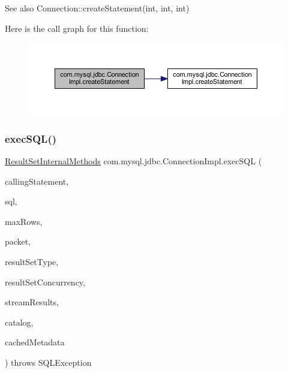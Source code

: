 \begin{DoxySeeAlso}{See also}
Connection\+::create\+Statement(int, int, int) 
\end{DoxySeeAlso}
Here is the call graph for this function\+:\nopagebreak
\begin{figure}[H]
\begin{center}
\leavevmode
\includegraphics[width=350pt]{classcom_1_1mysql_1_1jdbc_1_1_connection_impl_abcace91f81040aecda4bb5b0528a4228_cgraph}
\end{center}
\end{figure}
\mbox{\label{classcom_1_1mysql_1_1jdbc_1_1_connection_impl_ad757f25d671446b4bf4eec638de7ddce}} 
\subsubsection{\texorpdfstring{exec\+S\+Q\+L()}{execSQL()}}
{\footnotesize\ttfamily \mbox{\hyperlink{interfacecom_1_1mysql_1_1jdbc_1_1_result_set_internal_methods}{Result\+Set\+Internal\+Methods}} com.\+mysql.\+jdbc.\+Connection\+Impl.\+exec\+S\+QL (\begin{DoxyParamCaption}\item[{\mbox{\hyperlink{classcom_1_1mysql_1_1jdbc_1_1_statement_impl}{Statement\+Impl}}}]{calling\+Statement,  }\item[{String}]{sql,  }\item[{int}]{max\+Rows,  }\item[{\mbox{\hyperlink{classcom_1_1mysql_1_1jdbc_1_1_buffer}{Buffer}}}]{packet,  }\item[{int}]{result\+Set\+Type,  }\item[{int}]{result\+Set\+Concurrency,  }\item[{boolean}]{stream\+Results,  }\item[{String}]{catalog,  }\item[{\mbox{\hyperlink{classcom_1_1mysql_1_1jdbc_1_1_field}{Field}} \mbox{[}$\,$\mbox{]}}]{cached\+Metadata }\end{DoxyParamCaption}) throws S\+Q\+L\+Exception}

